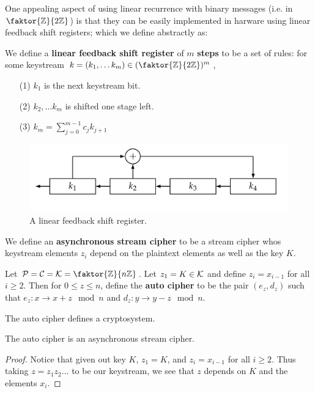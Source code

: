 One appealing aspect of using linear recurrence with binary messages (i.e. in
$\faktor{\Z}{2\Z}$) is that they can be easily implemented in harware using
linear feedback shift registers; which we define abstractly as:

\begin{definition}
    We define a \textbf{linear feedback shift register} of $m$ \textbf{steps} to
    be a set of rules: for some keystream $k=(k_1, \dots k_m) \in
    (\faktor{\Z}{2\Z})^m$,
    \begin{enumerate}
        \item[(1)] $k_1$ is the next  keystream bit.

        \item[(2)] $k_2, \dots k_m$ is shifted one stage left.

        \item[(3)] $k_m=\sum_{j=0}^{m-1}{c_jk_{j+1}}$
    \end{enumerate}
\end{definition}

\begin{figure}
    \centering
    \includegraphics[scale=0.3]{Figures/Chapter2/lfsr.png}
    \caption{A linear feedback shift register.}
    \label{fig_1.4}
\end{figure}

\begin{definition}
    We define an \textbf{asynchronous stream cipher} to be a stream cipher whos
    keystream elements $z_i$ depend on the plaintext elements as well as the key
     $K$.
\end{definition}

\begin{definition}
    Let $\Pc=\Cc=\Kc=\faktor{\Z}{n\Z}$. Let $z_1=K \in \mathcal{K}$ and define
    $z_i=x_{i-1}$ for all $i \geq 2$. Then for  $0 \leq z \leq n$, define the
    \textbf{auto cipher} to be the pair $(e_z,d_z)$ such that $e_z:x \rightarrow
    x+z \mod{n}$ and $d_z:y \rightarrow y-z \mod{n}$.
\end{definition}

\begin{theorem}\label{1.1.10}
    The auto cipher defines a cryptosystem.
\end{theorem}
\begin{corollary}
    The auto cipher is an asynchronous stream cipher.
\end{corollary}
\begin{proof}
    Notice that given out key $K$,  $z_1=K$, and $z_i=x_{i-1}$ for all $i \geq
    2$. Thus taking  $z=z_1z_2 \dots$ to be our keystream, we see that $z$
    depends on $K$ and the elements $x_i$.
\end{proof}

